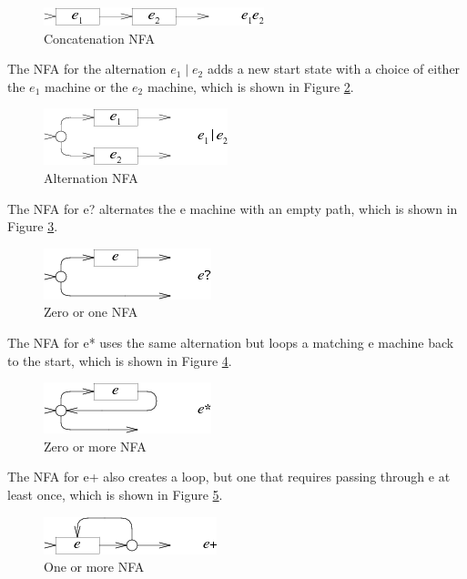\begin{figure}[htbp]
  \centering
  \includegraphics[scale=1]{images/concatenation_tokens.png}
  \caption{Concatenation NFA}
  \label{fig:nfa_cocat}
\end{figure}

The NFA for the alternation $e_1\mid e_2$ adds a new start state with a choice of either the $e_1$ machine or the $e_2$ machine, which is shown in Figure \ref{fig:nfa_alternation}.


\begin{figure}[htbp]
  \centering
  \includegraphics[scale=1]{images/alternation.png}
  \caption{Alternation NFA}
  \label{fig:nfa_alternation}
\end{figure}

The NFA for e? alternates the e machine with an empty path, which is shown in Figure \ref{fig:nfa_question}.


\begin{figure}[htbp]
  \centering
  \includegraphics[scale=1]{images/question.png}
  \caption{Zero or one NFA}
  \label{fig:nfa_question}
\end{figure}

The NFA for e* uses the same alternation but loops a matching e machine back to the start, which is shown in Figure \ref{fig:nfa_star}.

\begin{figure}[htbp]
  \centering
  \includegraphics[scale=1]{images/star.png}
  \caption{Zero or more NFA}
  \label{fig:nfa_star}
\end{figure}

The NFA for e+ also creates a loop, but one that requires passing through e at least once, which is shown in Figure \ref{fig:nfa_plus}.

\begin{figure}[htbp]
  \centering
  \includegraphics[scale=1]{images/plus.png}
  \caption{One or more NFA}
  \label{fig:nfa_plus}
\end{figure}




